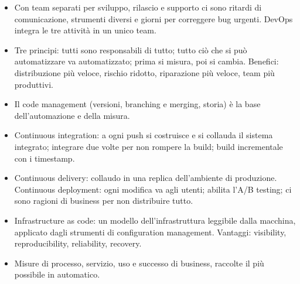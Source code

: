 \begin{puntichiave}
\begin{itemize}
  \item Con team separati per sviluppo, rilascio e supporto ci sono ritardi di comunicazione, strumenti diversi e giorni
    per correggere bug urgenti. DevOps integra le tre attività in un unico team.
  \item Tre principi: tutti sono responsabili di tutto; tutto ciò che si può automatizzare va automatizzato; prima si
    misura, poi si cambia. Benefici: distribuzione più veloce, rischio ridotto, riparazione più veloce, team più
    produttivi.
  \item Il code management (versioni, branching e merging, storia) è la base dell'automazione e della misura.
  \item Continuous integration: a ogni push si costruisce e si collauda il sistema integrato; integrare due volte per
    non rompere la build; build incrementale con i timestamp.
  \item Continuous delivery: collaudo in una replica dell'ambiente di produzione. Continuous deployment: ogni modifica
    va agli utenti; abilita l'A/B testing; ci sono ragioni di business per non distribuire tutto.
  \item Infrastructure as code: un modello dell'infrastruttura leggibile dalla macchina, applicato dagli strumenti di
    configuration management. Vantaggi: visibility, reproducibility, reliability, recovery.
  \item Misure di processo, servizio, uso e successo di business, raccolte il più possibile in automatico.
\end{itemize}
\end{puntichiave}

